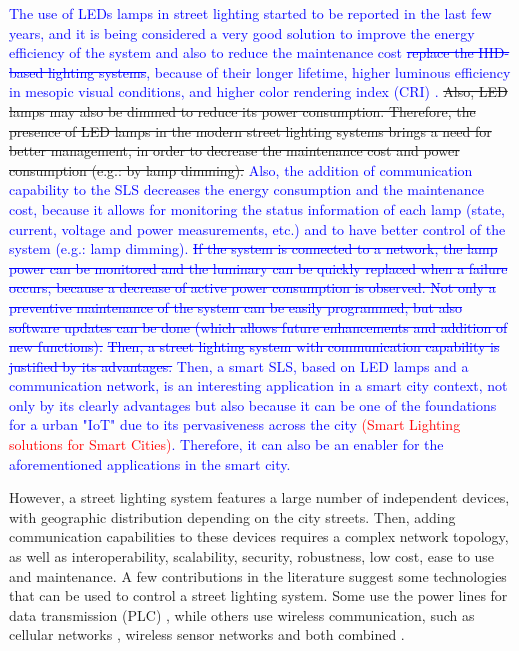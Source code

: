 \documentclass[authoryear,preprint,review,12pt]{elsarticle}
\newcommand{\rev}{\textcolor{blue}}
\newcommand{\refs}{\textcolor{red}}
\begin{document}
\rev{The use of LEDs lamps in street lighting started to be reported in the last few years, and it is being considered a very good solution to improve the energy efficiency of the system and also to reduce the maintenance cost \sout{replace the HID-based lighting systems}, because of their longer lifetime, higher luminous efficiency in mesopic visual conditions, and higher color rendering index (CRI) \citep{CRI_2008,CRI_2010}.} \sout{Also, LED lamps may also be dimmed to reduce its power consumption.
Therefore, the presence of LED lamps in the modern street lighting systems brings a need for better management, in order to decrease the maintenance cost and power consumption (e.g.: by lamp dimming).} \rev{Also, the addition of communication capability to the SLS decreases the energy consumption and the maintenance cost, because it allows for monitoring the status information of each lamp (state, current, voltage and power measurements, etc.) and to have better control of the system (e.g.: lamp dimming). \sout{If the system is connected to a network, the lamp power can be monitored and the luminary can be quickly replaced when a failure occurs, because a decrease of active power consumption is observed. Not only a preventive maintenance of the system can be easily programmed, but also software updates can be done (which allows future enhancements and addition of new functions).}  \sout{Then, a street lighting system with communication capability is justified by its advantages.} Then, a smart SLS, based on LED lamps and a communication network, is an interesting application in a smart city context, not only by its clearly advantages but also because it can be one of the foundations for a urban "IoT" due to its pervasiveness across the city \refs{(Smart Lighting solutions for Smart Cities)}. Therefore, it can also be an enabler for the aforementioned applications in the smart city.}


However, a street lighting system features a large number of independent devices, with geographic distribution depending on the city streets. Then, adding communication capabilities to these devices requires a complex network topology, as well as interoperability, scalability, security, robustness, low cost, ease to use and maintenance. A few contributions in the literature suggest some technologies that can be used to control a street lighting system. Some use the power lines for data transmission (PLC) \citep{PLC_Street_Lighting_2003,PLC_Street_Lighting_2006}, while others use wireless communication, such as cellular networks \citep{Cellular_Street_Lighting_2009_1,Cellular_Street_Lighting_2010_1}, wireless sensor networks \citep{WSN_Street_Lighting_2010_1, WSN_Street_Lighting_2010_2} and both combined \citep{WSN_Street_lighting_2006, WSN_Street_lighting_2007}.
\end{document}
